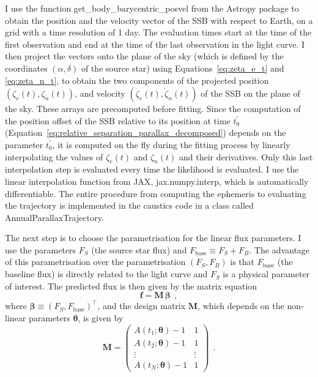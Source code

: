 \documentclass[12pt,dvipsnames]{report}
\newcommand{\ssf}[1]{\textsf{#1}}
\renewcommand{\vec}[1]{\boldsymbol{\mathbf{#1}}}
\newcommand{\hquad}{~~}
\begin{document}
I use the function \ssf{get\_body\_barycentric\_posvel} from the \ssf{Astropy} package to obtain the 
position and the velocity vector of the SSB with respect to Earth, 
on a grid with a time resolution of 1 day.
The evaluation times start at the time of the first observation and end at the time of the
last observation in the light curve. I then project the vectors onto the plane of 
the sky (which is defined by the coordinates $(\alpha, \delta)$ of the source star) 
using Equations~\ref{eq:zeta_e_t} and \ref{eq:zeta_n_t}, to obtain the two components 
of the projected position $(\zeta_e(t), \zeta_n(t))$, and velocity 
$(\dot\zeta_e(t), \dot\zeta_n(t))$ of the SSB on the plane of the sky. These arrays 
are precomputed before fitting. Since the computation of the position offset of the SSB 
relative to its position at time $t_0^\prime$ 
(Equation~\ref{eq:relative_separation_parallax_decomposed}) depends on the parameter
$t_0^\prime$, it is computed on the fly during the fitting process by linearly
interpolating the values of $\zeta_e(t)$ and $\zeta_n(t)$ and their derivatives. 
Only this last interpolation step is evaluated every time the likelihood is evaluated.
I use the linear interpolation function from \ssf{JAX}, \ssf{jax.numpy.interp},
which is automatically differentiable.
The entire procedure from computing the ephemeris to evaluating the trajectory is implemented 
in the \ssf{caustics} code in a class called \ssf{AnnualParallaxTrajectory}.

The next step is to choose the parametrisation for the linear flux parameters.
I use the parameters $F_S$ (the source star flux) and 
$F_\mathrm{base}\equiv F_S + F_B$. 
The advantage of this parametrisation over the parametrisation $(F_S,F_B)$ is that 
$F_\mathrm{base}$ (the baseline flux) is directly related to the light curve and  
$F_S$ is a physical parameter of interest. 
The predicted flux is then given by the matrix equation
\begin{equation}
    \vec f =\vec M \,\vec \beta 
    \hquad,
    \label{eq:flux_microlensing}
\end{equation}
where $\vec \beta \equiv (F_S, F_\mathrm{base})^\intercal$, and 
the design matrix $\vec M$, which depends on the non-linear parameters $\vec\theta$, 
is given by
\begin{equation}
    \vec M = \begin{pmatrix} 
        A(t_1;\vec\theta) - 1 & 1 \\ 
        A(t_2;\vec\theta) - 1& 1 \\ 
        \vdots & \vdots \\ 
        A(t_N;\vec\theta) - 1 & 1
    \end{pmatrix}
    \hquad .
\end{equation}
\end{document}

